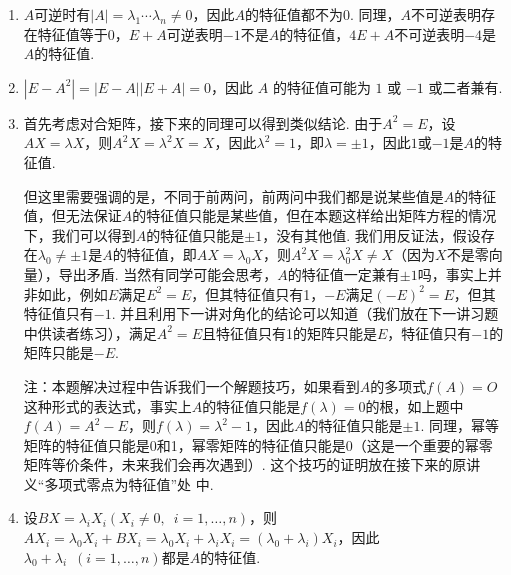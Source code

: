 \documentclass[UTF8,12pt,a4paper,fontset=fandol]{ctexart}
\begin{document}
\begin{solve}
\begin{enumerate}
        \item $A$可逆时有$|A|=\lambda_1\cdots\lambda_n\neq 0$，因此$A$的特征值都不为0. 同理，$A$不可逆表明存在特征值等于0，$E+A$可逆表明$-1$不是$A$的特征值，$4E+A$不可逆表明$-4$是$A$的特征值.

        \item $|E - A^2| = |E - A||E + A| = 0$，因此 $A$ 的特征值可能为 $1$ 或 $-1$ 或二者兼有.

        \item 首先考虑对合矩阵，接下来的同理可以得到类似结论. 由于$A^2=E$，设$AX=\lambda X$，则$A^2X=\lambda^2X=X$，因此$\lambda^2=1$，即$\lambda=\pm 1$，因此$1$或$-1$是$A$的特征值.

              但这里需要强调的是，不同于前两问，前两问中我们都是说某些值是$A$的特征值，但无法保证$A$的特征值只能是某些值，但在本题这样给出矩阵方程的情况下，我们可以得到$A$的特征值只能是$\pm 1$，没有其他值. 我们用反证法，假设存在$\lambda_0\neq\pm 1$是$A$的特征值，即$AX=\lambda_0X$，则$A^2X=\lambda_0^2X\neq X$（因为$X$不是零向量），导出矛盾. 当然有同学可能会思考，$A$的特征值一定兼有$\pm 1$吗，事实上并非如此，例如$E$满足$E^2=E$，但其特征值只有1，$-E$满足$(-E)^2=E$，但其特征值只有$-1$. 并且利用下一讲对角化的结论可以知道（我们放在下一讲习题中供读者练习），满足$A^2=E$且特征值只有1的矩阵只能是$E$，特征值只有$-1$的矩阵只能是$-E$.

              注：本题解决过程中告诉我们一个解题技巧，如果看到$A$的多项式$f(A)=O$这种形式的表达式，事实上$A$的特征值只能是$f(\lambda)=0$的根，如上题中$f(A)=A^2-E$，则$f(\lambda)=\lambda^2-1$，因此$A$的特征值只能是$\pm 1$. 同理，幂等矩阵的特征值只能是0和1，幂零矩阵的特征值只能是0（这是一个重要的幂零矩阵等价条件，未来我们会再次遇到）. 这个技巧的证明放在接下来的原讲义“多项式零点为特征值”处 中.

        \item 设$BX=\lambda_iX_i(X_i\neq 0,\enspace i=1,\ldots,n)$，则$AX_i=\lambda_0X_i+BX_i=\lambda_0X_i+\lambda_iX_i=(\lambda_0+\lambda_i)X_i$，因此$\lambda_0+\lambda_i\enspace(i=1,\ldots,n)$都是$A$的特征值.


\end{enumerate}
\end{solve}
\end{document}
